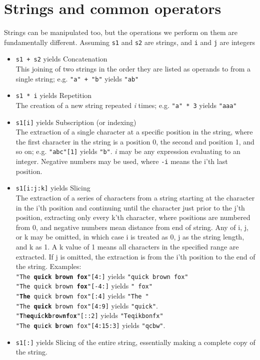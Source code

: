 \section{Strings and common operators}

Strings can be manipulated too, but the operations we perform on   them are fundamentally different. Assuming \texttt{s1} and \texttt{s2} are strings,   and \texttt{i} and \texttt{j} are integers
\begin{itemize}
	\item 
\texttt{s1 + s2} yields Concatenation
\\    This joining of two strings in the order they are listed as operands    to from a single string; e.g. 
\texttt{"a" + "b"} yields \texttt{"ab"}
	\item 
\texttt{s1 * i} yields Repetition
\\    The creation of a new string repeated \textit{i} times; e.g. 
\texttt{"a" * 3} yields \texttt{"aaa"}
	\item 
\texttt{s1[i]} yields Subscription (or indexing)
\\    The extraction of a single character at a specific position in the    string, where the first character in the string is a position 0,    the second and position 1, and so on; e.g. 
\texttt{"abc"[1]}    yields \texttt{"b"}. \textit{i} may be any expression evaluating to an integer.    Negative numbers may be used, where 
\texttt{-i} means the i'th    last position.
	\item 
\texttt{s1[i:j:k]} yields Slicing
\\    The extraction of a series of characters from a string starting at    the character in the i'th position and continuing until the    character just prior to the j'th position, extracting only every    k'th character, where positions are numbered from 0, and negative    numbers mean distance from end of string. Any of i, j, or k may be    omitted, in which case i is treated as 0, j as the string length, and    k as 1.  A k value of 1 means all characters in the    specified range are extracted. If j is omitted, the extraction is    from the i'th position to the end of the string.  Examples:
\\
\texttt{"The \textbf{quick brown fox}"[4:]} yields \texttt{"quick brown fox"}
\\
\texttt{"The quick brown\textbf{ fox}"[-4:]} yields \texttt{" fox"}
\\
\texttt{"\textbf{The }quick brown fox"[:4]} yields \texttt{"The "}
\\
\texttt{"The \textbf{quick} brown fox"[4:9]} yields \texttt{"quick"}.
\\
\texttt{"\textbf{T}h\textbf{e}\textbf{q}u\textbf{i}c\textbf{k}\textbf{b}r\textbf{o}w\textbf{n}\textbf{f}o\textbf{x}"[::2]} yields \texttt{"Teqikbonfx"}
\\
\texttt{"The \textbf{q}ui\textbf{c}k \textbf{b}ro\textbf{w}n fox"[4:15:3]} yields \texttt{"qcbw"}.
\\
	\item 
\texttt{s1[:]} yields Slicing of the entire string,    essentially making a complete copy of the string.
\end{itemize}

